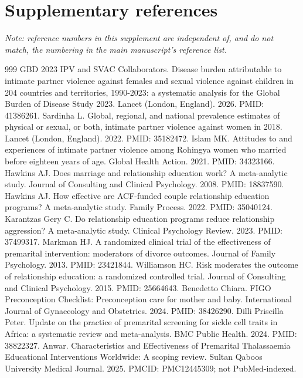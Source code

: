 \documentclass[11pt]{article}
\begin{document}
\clearpage
\section*{Supplementary references}
\noindent\footnotesize\textit{Note: reference numbers in this supplement are independent of, and do not match, the numbering in the main manuscript's reference list.}\smallskip

\begin{thebibliography}{999}\footnotesize
{} GBD 2023 IPV and SVAC Collaborators. Disease burden attributable to intimate partner violence against females and sexual violence against children in 204 countries and territories, 1990-2023: a systematic analysis for the Global Burden of Disease Study 2023. Lancet (London, England). 2026. PMID: 41386261.
 Sardinha L. Global, regional, and national prevalence estimates of physical or sexual, or both, intimate partner violence against women in 2018. Lancet (London, England). 2022. PMID: 35182472.
 Islam MK. Attitudes to and experiences of intimate partner violence among Rohingya women who married before eighteen years of age. Global Health Action. 2021. PMID: 34323166.
 Hawkins AJ. Does marriage and relationship education work? A meta-analytic study. Journal of Consulting and Clinical Psychology. 2008. PMID: 18837590.
 Hawkins AJ. How effective are ACF-funded couple relationship education programs? A meta-analytic study. Family Process. 2022. PMID: 35040124.
 Karantzas Gery C. Do relationship education programs reduce relationship aggression? A meta-analytic study. Clinical Psychology Review. 2023. PMID: 37499317.
 Markman HJ. A randomized clinical trial of the effectiveness of premarital intervention: moderators of divorce outcomes. Journal of Family Psychology. 2013. PMID: 23421844.
 Williamson HC. Risk moderates the outcome of relationship education: a randomized controlled trial. Journal of Consulting and Clinical Psychology. 2015. PMID: 25664643.
 Benedetto Chiara. FIGO Preconception Checklist: Preconception care for mother and baby. International Journal of Gynaecology and Obstetrics. 2024. PMID: 38426290.
 Dilli Priscilla Peter. Update on the practice of premarital screening for sickle cell traits in Africa: a systematic review and meta-analysis. BMC Public Health. 2024. PMID: 38822327.
 Anwar. Characteristics and Effectiveness of Premarital Thalassaemia Educational Interventions Worldwide: A scoping review. Sultan Qaboos University Medical Journal. 2025. PMCID: PMC12445309; not PubMed-indexed.

\end{thebibliography}
\end{document}
